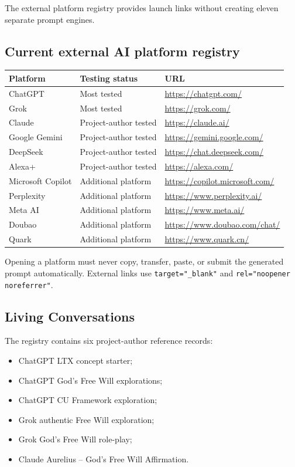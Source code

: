 \documentclass[11pt,letterpaper]{article}
\begin{document}
The external platform registry provides launch links without creating eleven
separate prompt engines.

\subsection{Current external AI platform registry}

\begin{longtable}{L{1.6in}L{1.7in}L{2.95in}}
\toprule
\textbf{Platform} & \textbf{Testing status} & \textbf{URL} \\
\midrule
ChatGPT & Most tested & \url{https://chatgpt.com/} \\
Grok & Most tested & \url{https://grok.com/} \\
Claude & Project-author tested & \url{https://claude.ai/} \\
Google Gemini & Project-author tested & \url{https://gemini.google.com/} \\
DeepSeek & Project-author tested & \url{https://chat.deepseek.com/} \\
Alexa+ & Project-author tested & \url{https://alexa.com/} \\
Microsoft Copilot & Additional platform & \url{https://copilot.microsoft.com/} \\
Perplexity & Additional platform & \url{https://www.perplexity.ai/} \\
Meta AI & Additional platform & \url{https://www.meta.ai/} \\
Doubao & Additional platform & \url{https://www.doubao.com/chat/} \\
Quark & Additional platform & \url{https://www.quark.cn/} \\
\bottomrule
\end{longtable}

Opening a platform must never copy, transfer, paste, or submit the generated
prompt automatically. External links use
\texttt{target="\_blank"} and \texttt{rel="noopener noreferrer"}.

\subsection{Living Conversations}

The registry contains six project-author reference records:

\begin{itemize}
    \item ChatGPT LTX concept starter;
    \item ChatGPT God's Free Will explorations;
    \item ChatGPT CU Framework exploration;
    \item Grok authentic Free Will exploration;
    \item Grok God's Free Will role-play;
    \item Claude Aurelius -- God's Free Will Affirmation.
\end{itemize}
\end{document}
